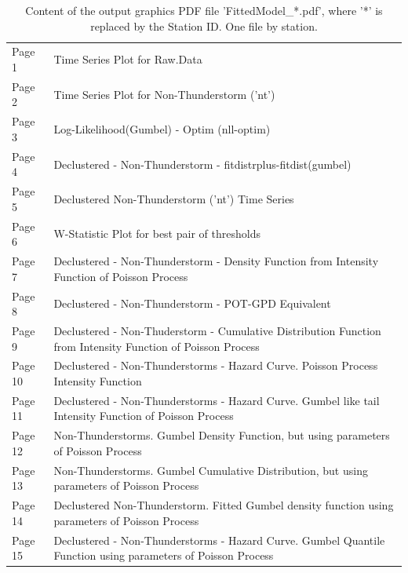 \documentclass[12pt,oneside]{reedthesis}
\begin{document}
\begingroup\fontsize{8}{10}\selectfont
\begin{longtable}[t]{>{\raggedright\arraybackslash}p{0.4in}>{\raggedright\arraybackslash}p{5.7in}}
\caption[Content of FittedModel\_*.pdf]{\label{tab:fittedmodelidpdf}Content of the output graphics PDF file 'FittedModel\_*.pdf', where '*' is replaced by the Station ID. One file by station.}\\
\toprule
\multicolumn{1}{l}{Graphic} & \multicolumn{1}{l}{Description}\\
\midrule
Page 1 & Time Series Plot for Raw.Data\\
Page 2 & Time Series Plot for Non-Thunderstorm ('nt')\\
Page 3 & Log-Likelihood(Gumbel) - Optim (nll-optim)\\
Page 4 & Declustered - Non-Thunderstorm - fitdistrplus-fitdist(gumbel)\\
Page 5 & Declustered Non-Thunderstorm ('nt') Time Series\\
Page 6 & W-Statistic Plot for best pair of thresholds\\
Page 7 & Declustered - Non-Thunderstorm - Density Function from Intensity Function of Poisson Process\\
Page 8 & Declustered - Non-Thunderstorm - POT-GPD Equivalent\\
Page 9 & Declustered - Non-Thuderstorm - Cumulative Distribution Function from Intensity Function of Poisson Process\\
Page 10 & Declustered - Non-Thunderstorms - Hazard Curve. Poisson Process Intensity Function\\
Page 11 & Declustered - Non-Thunderstorms - Hazard Curve. Gumbel like tail Intensity Function of Poisson Process\\
Page 12 & Non-Thunderstorms. Gumbel Density Function, but using parameters of Poisson Process\\
Page 13 & Non-Thunderstorms. Gumbel Cumulative Distribution, but using parameters of Poisson Process\\
Page 14 & Declustered Non-Thunderstorm. Fitted Gumbel density function using parameters of Poisson Process\\
Page 15 & Declustered - Non-Thunderstorms - Hazard Curve. Gumbel Quantile Function using parameters of Poisson Process\\
\bottomrule
\end{longtable}
\endgroup{}
\end{document}
